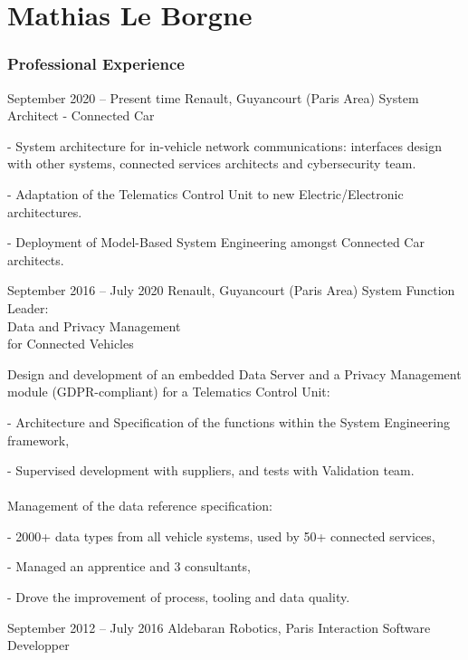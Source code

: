 \documentclass{tccv}
\begin{document}
\part{Mathias Le Borgne}

\section{Professional Experience}

\begin{eventlist}


\item{September 2020 -- Present time}
     {Renault, Guyancourt (Paris Area)}
     {System Architect - Connected Car}

- System architecture for in-vehicle network communications: interfaces design with other systems, connected services architects and cybersecurity team.

- Adaptation of the Telematics Control Unit to new Electric/Electronic architectures.

- Deployment of Model-Based System Engineering amongst Connected Car architects.

\item{September 2016 -- July 2020}
     {Renault, Guyancourt (Paris Area)}
     {System Function Leader: \\
      Data and Privacy Management \\
      for Connected Vehicles}


Design and development of an embedded Data Server 
and a Privacy Management module (GDPR-compliant) for a Telematics Control Unit:

  - Architecture and Specification of the functions within the System Engineering framework,
  
  - Supervised development with suppliers, and tests with Validation team.
\\
\\
Management of the data reference specification:

  - 2000+ data types from all vehicle systems, used by 50+ connected services,
  
  - Managed an apprentice and 3 consultants,
  
  - Drove the improvement of process, tooling and data quality.

\item{September 2012 -- July 2016}
     {Aldebaran Robotics, Paris}
     {Interaction Software Developper}


\end{eventlist}
\end{document}
